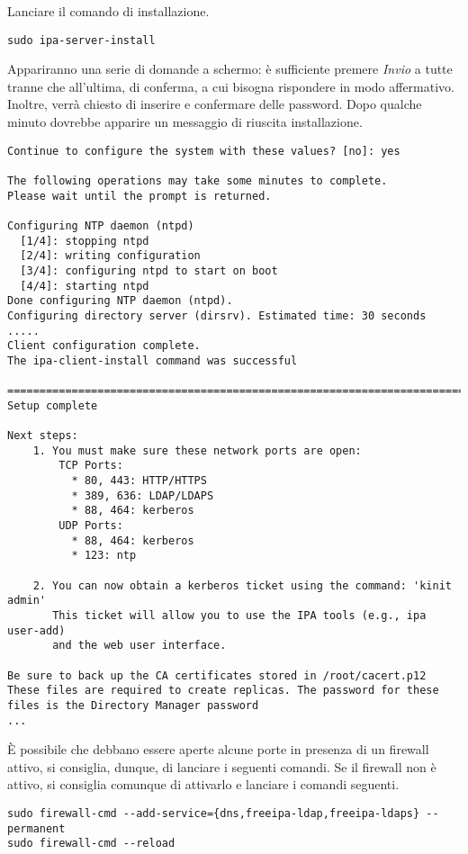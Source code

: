 Lanciare il comando di installazione.

\begin{verbatim}
sudo ipa-server-install
\end{verbatim}

Appariranno una serie di domande a schermo: è sufficiente premere
\emph{Invio} a tutte tranne che all'ultima, di conferma, a cui bisogna
rispondere in modo affermativo. Inoltre, verrà chiesto di inserire e
confermare delle password. Dopo qualche minuto dovrebbe apparire un
messaggio di riuscita installazione.

\begin{verbatim}
Continue to configure the system with these values? [no]: yes

The following operations may take some minutes to complete.
Please wait until the prompt is returned.

Configuring NTP daemon (ntpd)
  [1/4]: stopping ntpd
  [2/4]: writing configuration
  [3/4]: configuring ntpd to start on boot
  [4/4]: starting ntpd
Done configuring NTP daemon (ntpd).
Configuring directory server (dirsrv). Estimated time: 30 seconds
.....
Client configuration complete.
The ipa-client-install command was successful

==============================================================================
Setup complete

Next steps:
    1. You must make sure these network ports are open:
        TCP Ports:
          * 80, 443: HTTP/HTTPS
          * 389, 636: LDAP/LDAPS
          * 88, 464: kerberos
        UDP Ports:
          * 88, 464: kerberos
          * 123: ntp

    2. You can now obtain a kerberos ticket using the command: 'kinit admin'
       This ticket will allow you to use the IPA tools (e.g., ipa user-add)
       and the web user interface.

Be sure to back up the CA certificates stored in /root/cacert.p12
These files are required to create replicas. The password for these
files is the Directory Manager password
...
\end{verbatim}

È possibile che debbano essere aperte alcune porte in presenza di un
firewall attivo, si consiglia, dunque, di lanciare i seguenti comandi.
Se il firewall non è attivo, si consiglia comunque di attivarlo e
lanciare i comandi seguenti.

\begin{verbatim}
sudo firewall-cmd --add-service={dns,freeipa-ldap,freeipa-ldaps} --permanent
sudo firewall-cmd --reload
\end{verbatim}

